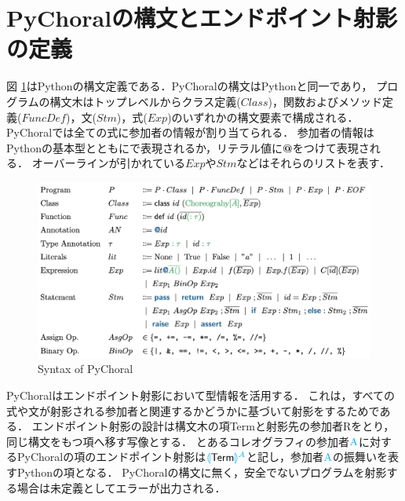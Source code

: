 \documentclass{thesis}
\newcommand{\projection}[2]{{\color{cyan}\llparenthesis}#1{\color{cyan}\rrparenthesis^#2}}
\newcommand{\mblue}[1]{\textbf{\textsf{\color{MidnightBlue}#1}}}
\newcommand{\cyan}[1]{\color{cyan}#1}
\begin{document}
\section{PyChoralの構文とエンドポイント射影の定義}
図 \ref{syntax}はPythonの構文定義である．PyChoralの構文はPythonと同一であり，
プログラムの構文木はトップレベルからクラス定義($Class$)，関数およびメソッド定義($FuncDef$)，文($Stm$)，式($Exp$)のいずれかの構文要素で構成される．
PyChoralでは全ての式に参加者の情報が割り当てられる．
参加者の情報はPythonの基本型とともに{\color{Green}{Typed Annotation}}で表現されるか，リテラル値に\mblue{@}をつけて表現される．
オーバーラインが引かれている$Exp$や$Stm$などはそれらのリストを表す．
\begin{figure}[H]
  \centering
  \includegraphics[scale=0.8]{image/syntax.png}
  \caption{Syntax of PyChoral}
  \label{syntax}
\end{figure}
PyChoralはエンドポイント射影において型情報を活用する．
これは，すべての式や文が射影される参加者と関連するかどうかに基づいて射影をするためである．
エンドポイント射影の設計は構文木の項\textsf{Term}と射影先の参加者\textsf{R}をとり，同じ構文をもつ項へ移す写像とする．
とあるコレオグラフィの参加者$\cyan{\text{A}}$に対するPyChoralの項のエンドポイント射影は$\projection{\textsf{Term}}{A}$と記し，参加者$\cyan{\text{A}}$の振舞いを表すPythonの項となる．
PyChoralの構文に無く，安全でないプログラムを射影する場合は未定義としてエラーが出力される．
%
\end{document}
